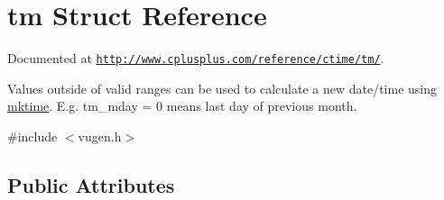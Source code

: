 \hypertarget{structtm}{\section{tm Struct Reference}
\label{structtm}
}


Documented at \href{http://www.cplusplus.com/reference/ctime/tm/}{\tt http\-://www.\-cplusplus.\-com/reference/ctime/tm/}. \par
Values outside of valid ranges can be used to calculate a new date/time using \hyperlink{group__time_gae114b9ba0fce4e2d6297e0e66768bb75}{mktime}. E.\-g. tm\-\_\-mday = 0 means last day of previous month.  




{\ttfamily \#include $<$vugen.\-h$>$}

\subsection*{Public Attributes}
